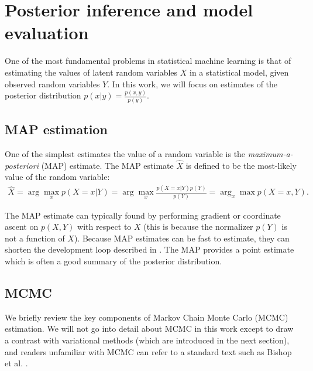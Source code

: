 
\section{Posterior inference and model evaluation}
One of the most fundamental problems in statistical machine learning
is that of estimating the values of latent random variables $X$ in a
statistical model, given observed random variables $Y$.  In this work, we will
focus on estimates of the posterior distribution $p(x | y) =
\frac{p(x, y)}{p(y)}$.

\subsection{MAP estimation}
One of the simplest estimates the value of a random variable is the \emph{maximum-a-posteriori} (MAP) estimate.  The MAP estimate $\hat X$ is defined to be the most-likely value of the random variable:
\begin{align}
  \hat X = \arg \max_x p(X=x | Y) = \arg \max_x \frac{p(X=x | Y) p(Y)}{p(Y)} = \arg_x \max p(X=x, Y).
\end{align}

The MAP estimate can typically found by performing gradient or
coordinate ascent on $p(X, Y)$ with respect to $X$ (this is because
the normalizer $p(Y)$ is not a function of $X$).  Because MAP
estimates can be fast to estimate, they can shorten the development
loop described in . The MAP provides a point estimate
which is often a good summary of the posterior distribution.

\subsection{MCMC}


We briefly review the key components of Markov Chain Monte Carlo
(MCMC) estimation.  We will not go into detail about MCMC in this work except to
draw a contrast with variational methods (which are introduced in the
next section), and readers unfamiliar with MCMC can refer to a
standard text such as Bishop et al. \cite{bishop:2006}.


